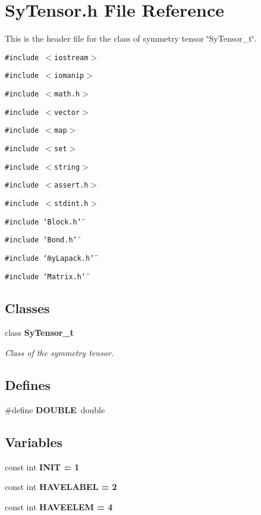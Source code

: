 \section{Sy\-Tensor.h File Reference}
\label{df/d91/SyTensor_8h}
This is the header file for the class of symmetry tensor \char`\"{}Sy\-Tensor\_\-t\char`\"{}. 

{\tt \#include $<$iostream$>$}\par
{\tt \#include $<$iomanip$>$}\par
{\tt \#include $<$math.h$>$}\par
{\tt \#include $<$vector$>$}\par
{\tt \#include $<$map$>$}\par
{\tt \#include $<$set$>$}\par
{\tt \#include $<$string$>$}\par
{\tt \#include $<$assert.h$>$}\par
{\tt \#include $<$stdint.h$>$}\par
{\tt \#include \char`\"{}Block.h\char`\"{}}\par
{\tt \#include \char`\"{}Bond.h\char`\"{}}\par
{\tt \#include \char`\"{}my\-Lapack.h\char`\"{}}\par
{\tt \#include \char`\"{}Matrix.h\char`\"{}}\par
\subsection*{Classes}
\begin{CompactItemize}
\item 
class \bf{Sy\-Tensor\_\-t}
\begin{CompactList}\small\item\em Class of the symmetry tensor. \item\end{CompactList}\end{CompactItemize}
\subsection*{Defines}
\begin{CompactItemize}
\item 
\#define \textbf{DOUBLE}~double\label{df/d91/SyTensor_8h_31831875813c1b908eb1e15a433499d5}

\end{CompactItemize}
\subsection*{Variables}
\begin{CompactItemize}
\item 
const int \bf{INIT} = 1
\item 
const int \bf{HAVELABEL} = 2
\item 
const int \bf{HAVEELEM} = 4
\end{CompactItemize}


